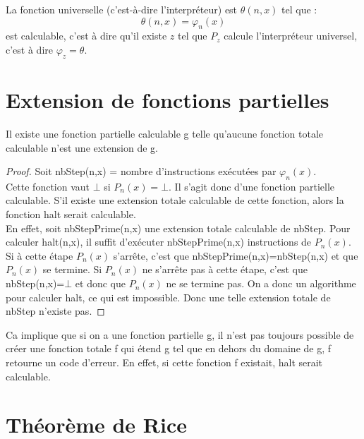 \begin{mytheo}
  \label{theo:fununiv}
	La fonction universelle (c'est-à-dire l'interpréteur) est $\theta(n,x)$ tel que :
	\[ \theta(n,x) = \varphi_n(x) \]
    est calculable, c'est à dire qu'il existe $z$ tel que $P_z$ calcule l'interpréteur universel,
    c'est à dire $\varphi_z = \theta$.
\end{mytheo}


\section{Extension de fonctions partielles}
\label{sec:extension_de_fonctions_partielles}

\begin{mytheo}
	Il existe une fonction partielle calculable g telle qu'aucune fonction totale calculable n'est une extension de g.
  \begin{proof}
    Soit nbStep(n,x)  = nombre d'instructions exécutées par $\varphi_n(x)$.\\
    Cette fonction vaut $\bot$ si $P_n(x) = \bot$. Il s'agit donc d'une fonction partielle calculable. S'il existe une extension totale calculable de cette fonction, alors la fonction halt serait calculable.\\
    En effet, soit nbStepPrime(n,x) une extension totale calculable de nbStep. Pour calculer halt(n,x), il suffit d'exécuter nbStepPrime(n,x) instructions de $P_n(x)$.  Si à cette étape $P_n(x)$ s'arrête, c'est que nbStepPrime(n,x)=nbStep(n,x) et que $P_n(x)$ se termine.  Si $P_n(x)$ ne s'arrête pas à cette étape, c'est que nbStep(n,x)=$\bot$ et donc que $P_n(x)$ ne se termine pas. On a donc un algorithme pour calculer halt, ce qui est impossible.  Donc une telle extension totale de nbStep n'existe pas.
  \end{proof}
\end{mytheo}

\begin{myrem}
	Ca implique que si on a une fonction partielle g, il n'est pas
	toujours possible de créer une fonction totale f qui étend g
	tel que en dehors du domaine de g, f retourne un code d'erreur.  En effet, si cette fonction f existait, halt serait calculable.
\end{myrem}


\section{Théorème de Rice}
\label{sub:theoreme_de_rice}

